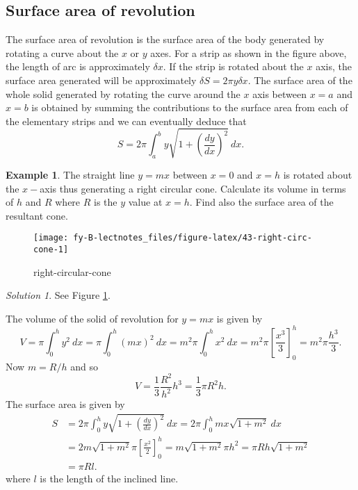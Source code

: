\documentclass[
  11pt,
  oneside]{book}
\newcommand{\slide}{}
\theoremstyle{definition}
\theoremstyle{definition}
\newtheorem{example}{Example}[chapter]
\theoremstyle{definition}
\theoremstyle{definition}
\theoremstyle{remark}
\newtheorem*{solution}{Solution}
\begin{document}
\subsection{Surface area of revolution}\label{surface-area-of-revolution}

The surface area of revolution is the surface area of the body generated by rotating a curve about the \(x\) or \(y\) axes. For a strip as shown in the figure above, the length of arc is approximately \(\delta x\). If the strip is rotated about the \(x\) axis, the surface area generated will be approximately \(\delta S = 2\pi y\delta x\). The surface area of the whole solid generated by rotating the curve around the \(x\) axis between \(x = a\) and \(x = b\) is obtained by summing the contributions to the surface area from each of the elementary strips and we can eventually deduce that
\[
S = 2\pi\int_a^b y\sqrt{1+\left(\frac{dy}{dx}\right)^2}\ dx.
\]
\slide

\begin{example}
\leavevmode

The straight line \(y=mx\) between \(x=0\) and \(x=h\) is rotated about the \(x-\)axis thus generating a right circular cone. Calculate its volume in terms of \(h\) and \(R\) where \(R\) is the \(y\) value at \(x=h\). Find also the surface area of the resultant cone.

\begin{figure}

{\centering \texttt{[image: fy-B-lectnotes\_files/figure-latex/43-right-circ-cone-1]} 

}

\caption{right-circular-cone}\label{fig:43-right-circ-cone}
\end{figure}

\end{example}

\begin{solution}
See Figure \ref{fig:43-right-circ-cone}.

The volume of the solid of revolution for \(y = mx\) is given by
\[
V = \pi\int_0^hy^2\ dx = \pi\int_0^h (mx)^2\ dx = m^2\pi\int_0^hx^2\ dx = m^2\pi\left[\frac{x^3}3\right]_0^h = m^2\pi\frac{h^3}3.
\]
Now \(m = R/h\) and so
\[
V = \frac13\frac{R^2}{h^2}h^3 = \frac13\pi R^2h.
\]
The surface area is given by
\begin{align*}
S&= 2\pi\int_0^hy\sqrt{1+\left(\frac{dy}{dx}\right)^2}\ dx = 2\pi\int_0^h mx\sqrt{1+m^2}\ dx\\
&= 2m\sqrt{1+m^2}\pi\left[\frac{x^2}2\right]_0^h = m\sqrt{1+m^2}\pi h^2 = \pi R h\sqrt{1+m^2}\\
&= \pi Rl.
\end{align*}
where \(l\) is the length of the inclined line.
\end{solution}
\end{document}
